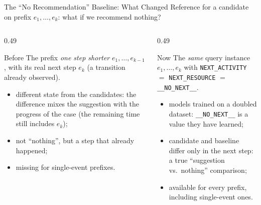 \documentclass[aspectratio=169]{beamer} %
\begin{document}
\begin{frame}{The ``No Recommendation'' Baseline: What Changed}
  \small
  Reference for a candidate on prefix $e_1,\dots,e_k$: \alert{what if we recommend
  nothing?}
  \vspace{0.1cm}
  \begin{columns}[T]
    \begin{column}{0.49\textwidth}
      \begin{block}{Before}
        \scriptsize
        The prefix \emph{one step shorter} $e_1,\dots,e_{k-1}$, with its real next
        step $e_k$ (a transition already observed).
        \begin{itemize}\scriptsize
          \item \alert{different state} from the candidates: the difference mixes the
            suggestion with the progress of the case (the remaining time still
            includes $e_k$);
          \item not ``nothing'', but a step that already happened;
          \item missing for single-event prefixes.
        \end{itemize}
      \end{block}
    \end{column}
    \begin{column}{0.49\textwidth}
      \begin{block}{Now}
        \scriptsize
        The \emph{same} query instance $e_1,\dots,e_k$ with \texttt{NEXT\_ACTIVITY}
        $=$ \texttt{NEXT\_RESOURCE} $=$ \texttt{\_\_NO\_NEXT\_\_}.
        \begin{itemize}\scriptsize
          \item models trained on a \alert{doubled dataset}: \texttt{\_\_NO\_NEXT\_\_}
            is a value they have learned;
          \item candidate and baseline differ \alert{only in the next step}: a true
            ``suggestion vs.\ nothing'' comparison;
          \item available for every prefix, including single-event ones.
        \end{itemize}
      \end{block}
    \end{column}
  \end{columns}
\end{frame}
\end{document}
